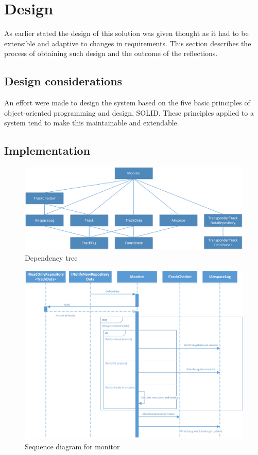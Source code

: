 \section{Design}
As earlier stated the design of this solution was given thought as it had to be extensible and adaptive to changes in requirements. This section describes the process of obtaining such design and the outcome of the reflections.

\subsection{Design considerations}
An effort were made to design the system based on the five basic principles of object-oriented programming and design, SOLID. These principles applied to a system tend to make this maintainable and extendable.

\subsection{Implementation}

\begin{figure}
\centering
\includegraphics[width=0.7\linewidth]{"Images/Dependency tree"}
\caption{Dependency tree}
\label{fig:Dependencytree}
\end{figure}

\begin{figure}
\centering
\includegraphics[width=1.0\linewidth]{Images/MonitorSeq}
\caption{Sequence diagram for monitor}
\label{fig:MonitorSeq}
\end{figure}

